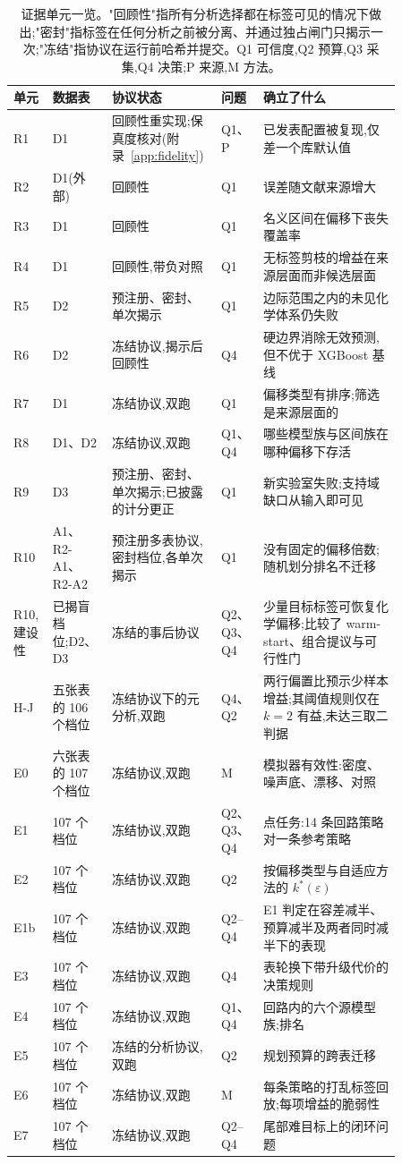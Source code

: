 \documentclass[11pt,a4paper]{ctexart}
\begin{document}
\begin{table}[htbp]
\centering\footnotesize
\caption{证据单元一览。"回顾性"指所有分析选择都在标签可见的情况下做出;"密封"指标签在任何分析之前被分离、并通过独占闸门只揭示一次;"冻结"指协议在运行前哈希并提交。Q1 可信度,Q2 预算,Q3 采集,Q4 决策;P 来源,M 方法。}
\label{tab:resultsmap}
\begin{tabular}{p{0.07\linewidth}p{0.13\linewidth}p{0.26\linewidth}p{0.06\linewidth}p{0.34\linewidth}}
\toprule
单元 & 数据表 & 协议状态 & 问题 & 确立了什么 \\
\midrule
R1 & D1 & 回顾性重实现;保真度核对(附录~\ref{app:fidelity}) & Q1、P & 已发表配置被复现,仅差一个库默认值 \\
R2 & D1(外部) & 回顾性 & Q1 & 误差随文献来源增大 \\
R3 & D1 & 回顾性 & Q1 & 名义区间在偏移下丧失覆盖率 \\
R4 & D1 & 回顾性,带负对照 & Q1 & 无标签剪枝的增益在来源层面而非候选层面 \\
R5 & D2 & 预注册、密封、单次揭示 & Q1 & 边际范围之内的未见化学体系仍失败 \\
R6 & D2 & 冻结协议,揭示后回顾性 & Q4 & 硬边界消除无效预测,但不优于 XGBoost 基线 \\
R7 & D1 & 冻结协议,双跑 & Q1 & 偏移类型有排序;筛选是来源层面的 \\
R8 & D1、D2 & 冻结协议,双跑 & Q1、Q4 & 哪些模型族与区间族在哪种偏移下存活 \\
R9 & D3 & 预注册、密封、单次揭示;已披露的计分更正 & Q1 & 新实验室失败;支持域缺口从输入即可见 \\
R10 & A1、R2-A1、R2-A2 & 预注册多表协议,密封档位,各单次揭示 & Q1 & 没有固定的偏移倍数;随机划分排名不迁移 \\
R10,建设性 & 已揭盲档位;D2、D3 & 冻结的事后协议 & Q2、Q3、Q4 & 少量目标标签可恢复化学偏移;比较了 warm-start、组合提议与可行性门 \\
H-J & 五张表的 106 个档位 & 冻结协议下的元分析,双跑 & Q4、Q2 & 两行偏置比预示少样本增益;其阈值规则仅在 $k=2$ 有益,未达三取二判据 \\
E0 & 六张表的 107 个档位 & 冻结协议,双跑 & M & 模拟器有效性:密度、噪声底、漂移、对照 \\
E1 & 107 个档位 & 冻结协议,双跑 & Q2、Q3、Q4 & 点任务:14 条回路策略对一条参考策略 \\
E2 & 107 个档位 & 冻结协议,双跑 & Q2 & 按偏移类型与自适应方法的 $k^{*}(\varepsilon)$ \\
E1b & 107 个档位 & 冻结协议,双跑 & Q2--Q4 & E1 判定在容差减半、预算减半及两者同时减半下的表现 \\
E3 & 107 个档位 & 冻结协议,双跑 & Q4 & 表轮换下带升级代价的决策规则 \\
E4 & 107 个档位 & 冻结协议,双跑 & Q1、Q4 & 回路内的六个源模型族;排名 \\
E5 & 107 个档位 & 冻结的分析协议,双跑 & Q2 & 规划预算的跨表迁移 \\
E6 & 107 个档位 & 冻结协议,双跑 & M & 每条策略的打乱标签回放;每项增益的脆弱性 \\
E7 & 107 个档位 & 冻结协议,双跑 & Q2--Q4 & 尾部难目标上的闭环问题 \\
\bottomrule
\end{tabular}
\end{table}
\end{document}
